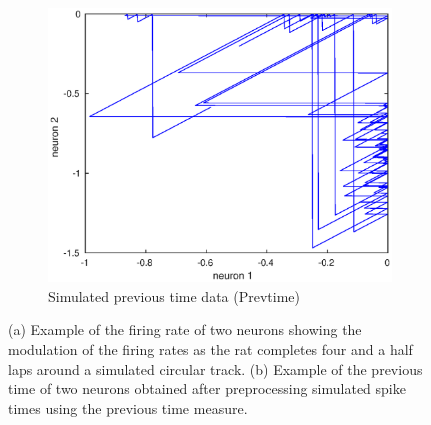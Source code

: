 \begin{figure}[H]
\begin{subfigure}[b]{0.475\textwidth}
            \label{fig:Prevtime in 3D}
        \end{subfigure}
        \hfill
        \begin{subfigure}[b]{0.475\textwidth}  
            \centering 
            \includegraphics[width=\textwidth]{./images/SimPrevtime.eps}
            \caption[]%
            {{\small Simulated previous time data (Prevtime)}}  
            \label{fig:Sim animal position in 3D}
        \end{subfigure}
        \caption[]%
         {\small  (a) Example of the firing rate of two neurons showing the modulation of the firing rates as the rat completes four and a half laps around a simulated circular track.
         (b) Example of the previous time of two neurons obtained after preprocessing  simulated spike times using  the 
         previous time measure.} 
         \label{fig:Simulated_datasets}
\end{figure}
        
        
        
